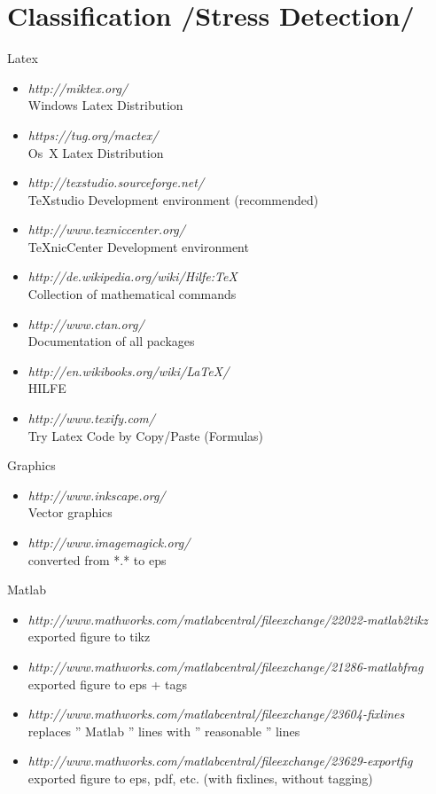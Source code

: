 \section{Classification /Stress Detection/}
Latex
\begin{itemize}
	\item \emph{http://miktex.org/}   \\ Windows Latex Distribution
	\item \emph{https://tug.org/mactex/}   \\ Os~X Latex Distribution
	\item \emph{http://texstudio.sourceforge.net/}  \\ TeXstudio Development environment (recommended)
	\item \emph{http://www.texniccenter.org/}  \\ TeXnicCenter Development environment
	\item \emph{http://de.wikipedia.org/wiki/Hilfe:TeX}   \\ Collection of mathematical commands
	\item \emph{http://www.ctan.org/} \\ Documentation of all packages
	\item \emph{http://en.wikibooks.org/wiki/LaTeX/} \\ HILFE
	\item \emph{http://www.texify.com/}	\\ Try Latex Code by Copy/Paste (Formulas)
\end{itemize}
Graphics
\begin{itemize}
	\item \emph{http://www.inkscape.org/}   \\ Vector graphics
	\item \emph{http://www.imagemagick.org/}  \\ converted from *.* to eps	
\end{itemize}
\clearpage
Matlab
\begin{itemize}
	\item \emph{http://www.mathworks.com/matlabcentral/fileexchange/22022-matlab2tikz} \\ exported figure to tikz
	\item \emph{http://www.mathworks.com/matlabcentral/fileexchange/21286-matlabfrag} \\ exported figure to eps + tags
	\item \emph{http://www.mathworks.com/matlabcentral/fileexchange/23604-fixlines} \\ replaces '' Matlab '' lines with '' reasonable '' lines
	\item \emph{http://www.mathworks.com/matlabcentral/fileexchange/23629-exportfig} \\ exported figure to eps, pdf, etc. (with fixlines, without tagging)
\end{itemize}
